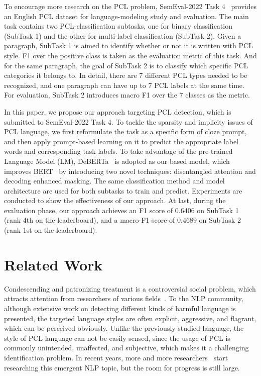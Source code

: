 \documentclass[11pt]{article}
\begin{document}
To encourage more research on the PCL problem, SemEval-2022 Task 4~\cite{perezalmendros2022semeval} provides an English PCL dataset for language-modeling study and evaluation.
The main task contains two PCL-classification subtasks, one for binary classification (SubTask 1) and the other for multi-label classification (SubTask 2).
Given a paragraph, SubTask 1 is aimed to identify whether or not it is written with PCL style.
F1 over the positive class is taken as the evaluation metric of this task.
And for the same paragraph, the goal of SubTask 2 is to classify which specific PCL categories it belongs to. 
In detail, there are 7 different PCL types needed to be recognized, and one paragraph can have up to 7 PCL labels at the same time.
For evaluation, SubTask 2 introduces macro F1 over the 7 classes as the metric.

In this paper, we propose our approach targeting PCL detection, which is submitted to SemEval-2022 Task 4.
To tackle the sparsity and implicity issues of PCL language, we first reformulate the task as a specific form of cloze prompt, and then apply prompt-based learning on it to predict the appropriate label words and corresponding task labels.
To take advantage of the pre-trained Language Model (LM), DeBERTa~\cite{he2020deberta} is adopted as our based model, which improves BERT~\cite{devlin2018bert} by introducing two novel techniques: disentangled attention and decoding enhanced masking.
The same classification method and model architecture are used for both subtasks to train and predict.
Experiments are conducted to show the effectiveness of our approach.
At last, during the evaluation phase, our approach achieves an F1 score of 0.6406 on SubTask 1 (rank 4th on the leaderboard), and a macro-F1 score of 0.4689 on SubTask 2 (rank 1st on the leaderboard).

\section{Related Work}
Condescending and patronizing treatment is a controversial social problem, which attracts attention from researchers of various fields~\cite{margic2017communication, huckin2002critical}. 
To the NLP community, although extensive work on detecting different kinds of harmful language is presented, the targeted language styles are often explicit, aggressive, and flagrant, which can be perceived obviously.
Unlike the previously studied language, the style of PCL language can not be easily sensed, since the usage of PCL is commonly unintended, unaffected, and subjective, which makes it a challenging identification problem.
In recent years, more and more researchers~\cite{mendelsohn2020framework, sap2019social} start researching this emergent NLP topic, but the room for progress is still large. 
\end{document}

